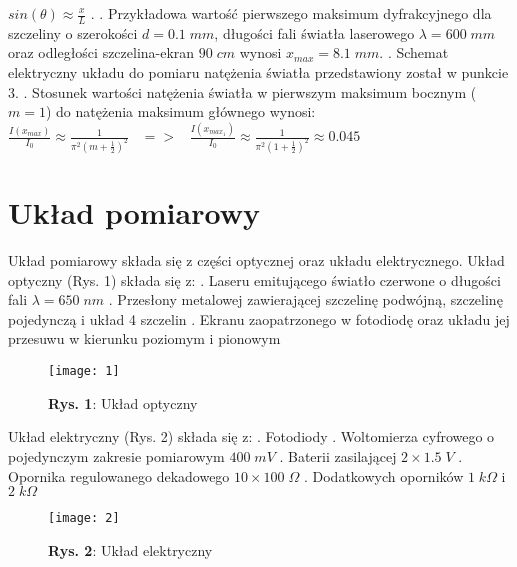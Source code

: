 \documentclass[12pt]{article}
\begin{document}
$sin(\theta)\approx\frac{x}{L}$ . . Przykładowa wartość pierwszego maksimum dyfrakcyjnego dla szczeliny o szerokości $d=0.1\;mm$, długości fali światła laserowego $\lambda=600\;mm$ oraz odległości szczelina-ekran $90\;cm$ wynosi $x_{max}=8.1\;mm$. . Schemat elektryczny układu do pomiaru natężenia światła przedstawiony został w punkcie $3$. . Stosunek wartości natężenia światła w pierwszym maksimum bocznym ($m=1$) do natężenia maksimum głównego wynosi: \newline
{\Large $ \frac{I(x_{max})}{I_0}\approx\frac{1}{\pi^2(m+\frac{1}{2})^2}\;\;\;=>\;\;\;
\frac{I(x_{max_1})}{I_0}\approx\frac{1}{\pi^2(1+\frac{1}{2})^2}\approx 0.045  $} \newpage
\section{Układ pomiarowy}
Układ pomiarowy składa się z części optycznej oraz układu elektrycznego. \newline
Układ optyczny (Rys. 1) składa się z: . Laseru emitującego światło czerwone o długości fali $\lambda=650\;nm$ . Przesłony metalowej zawierającej szczelinę podwójną, szczelinę pojedynczą i układ 4 szczelin . Ekranu zaopatrzonego w fotodiodę oraz układu jej przesuwu w kierunku poziomym i pionowym \newline
\begin{figure}[H]
\centering
\texttt{[image: 1]}
\caption*{\textbf{Rys. 1}: Układ optyczny}
\end{figure} 
\noindent Układ elektryczny (Rys. 2) składa się z: . Fotodiody . Woltomierza cyfrowego o pojedynczym zakresie pomiarowym $400\;mV$ . Baterii zasilającej  $2\times1.5\;V$ . Opornika regulowanego dekadowego $10\times100\;\Omega$ . Dodatkowych oporników $1\;k\Omega$ i $2\;k\Omega$ 
\begin{figure}[H]
\centering
\texttt{[image: 2]}
\caption*{\textbf{Rys. 2}: Układ elektryczny }
\end{figure} \newpage
\end{document}
